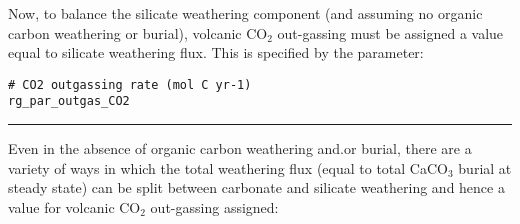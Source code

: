 \vspace{2mm}
Now, to balance the silicate weathering component (and assuming no organic carbon weathering or burial), volcanic CO$_{2}$ out-gassing must be assigned a value equal to silicate weathering flux. This is specified by the parameter:
\vspace{-1mm}\small\begin{verbatim}
# CO2 outgassing rate (mol C yr-1)
rg_par_outgas_CO2
\end{verbatim}\normalsize\vspace{-1mm}

\vspace{-1mm}
\noindent\rule{4cm}{0.5pt}
\vspace{2mm}

\newpage
%
\noindent Even in the absence of organic carbon weathering and.or burial, there are a variety of ways in which the total weathering flux (equal to total CaCO$_{3}$ burial at steady state) can be split between carbonate and silicate weathering and hence a value for volcanic CO$_{2}$ out-gassing assigned:

